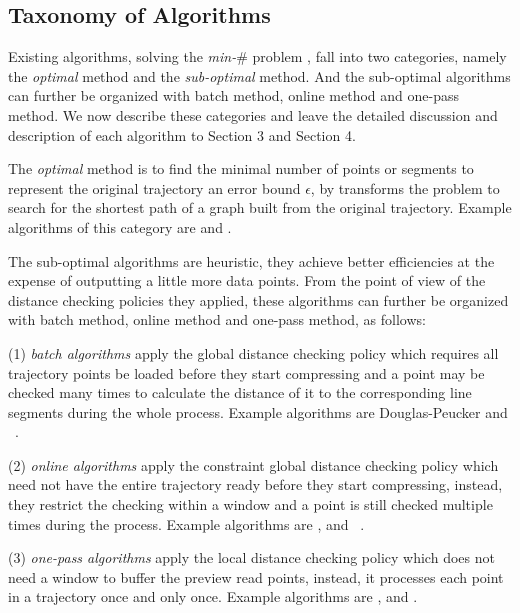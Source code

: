 \subsection {Taxonomy of Algorithms}
\label{subsec-taxonomy}

Existing \lsa algorithms, solving the \emph{min-$\#$} problem \cite{Chan:Optimal, Imai:Optimal,Pavlidis:Segment}, fall into two categories, namely the \textit{optimal} method and the \textit{sub-optimal} method. And the sub-optimal algorithms can further be organized with batch method, online method and one-pass method.
We now describe these categories and leave the detailed discussion and description of each algorithm to Section 3 and Section 4.

The \textit{optimal} method is to find the minimal number of points or segments to represent the original trajectory \wrt an error bound $\epsilon$, by transforms the problem to search for the shortest path of a graph built from the original trajectory.
Example algorithms of this category are \opt \cite{Chan:Optimal} and \optp \cite{Chan:Optimal}.

The sub-optimal algorithms are heuristic, they achieve better efficiencies at the expense of outputting a little more data points.
From the point of view of the distance checking policies they applied, these algorithms can further be organized with
batch method, online method and one-pass method, as follows:

\ni (1) \textit{batch algorithms} apply the global distance checking policy which requires all trajectory points be loaded before they start compressing and a point may be checked many times to calculate the distance of it to the corresponding line segments during the whole process. Example algorithms are Douglas-Peucker\cite{Douglas:Peucker,Meratnia:Spatiotemporal} and \pavlidis~\cite{Pavlidis:Segment}.

\ni (2) \textit{online algorithms} apply the constraint global distance checking policy which need not have the entire trajectory ready before they start compressing, instead, they restrict the checking within a window and a point is still checked multiple times during the process. Example algorithms are \opwa \cite{Meratnia:Spatiotemporal}, \bqsa\cite{Liu:BQS} and \squishe~\cite{Muckell:SQUISH}.

\ni (3) \textit{one-pass algorithms} apply the local distance checking policy which does not need a window to buffer the preview read points, instead, it processes each point in a trajectory once and only once. Example algorithms are \operb\cite{Lin:Operb}, \siped \cite{Williams:Longest,Sklansky:Cone,Dunham:Cone, Zhao:Sleeve} and \cised \cite{Lin:Cised}.

